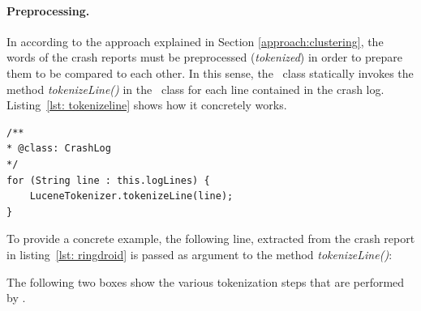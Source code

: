 \paragraph{Preprocessing.}
In according to the approach explained in Section \ref{approach:clustering}, the words of the crash reports must be preprocessed (\textit{tokenized}) in order to prepare them to be compared to each other. 
In this sense, the \Crash\ class statically invokes the method \textit{tokenizeLine()} in the \Lucene\ class for each line contained in the crash log. Listing~\ref{lst: tokenizeline} shows how it concretely works. 
\begin{lstlisting}[caption=Each line inside the crash report is tokenized using \Lucene,label={lst: tokenizeline}]
/**
* @class: CrashLog
*/
for (String line : this.logLines) {
	LuceneTokenizer.tokenizeLine(line);
}
\end{lstlisting} 
To provide a concrete example, the following line, extracted from the crash report in listing~\ref{lst: ringdroid} is passed as argument to the method \textit{tokenizeLine()}: \vspace{-0.8cm}
\begin{center}
 \par
\end{center}
The following two boxes show the various tokenization steps that are performed by \toolname.
